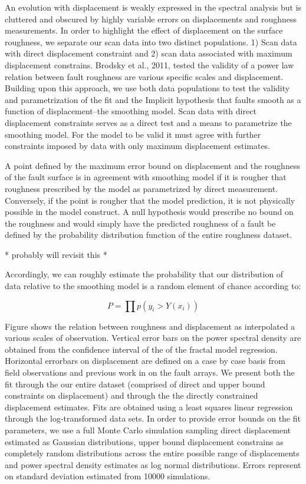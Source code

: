 \documentclass[12pt,a4paper]{article}
\begin{document}
An evolution with displacement is weakly expressed in the spectral analysis but is cluttered and obscured by highly variable errors on displacements and roughness measurements. In order to highlight the effect of displacement on the surface roughness, we separate our scan data into two distinct populations. 1) Scan data with direct displacement constraint and 2) scan data associated with maximum displacement constrains.  Brodsky et al., 2011, tested the validity of a power law relation between fault roughness are various specific scales and displacement. Building upon this approach, we use both data populations to test the validity and parametrization of the fit and the Implicit hypothesis that faults smooth as a function of displacement--the smoothing model. Scan data with direct displacement constraints serves as a direct test and a means to parametrize the smoothing model. For the model to be valid it must agree with further constraints imposed by data with only maximum displacement estimates.

A point defined by the maximum error bound on displacement and the roughness of the fault surface is in agreement with smoothing model if it is rougher that roughness prescribed by the model as parametrized by direct measurement. Conversely, if the point is rougher that the model prediction, it is not physically possible in the model construct. A null hypothesis would prescribe no bound on the roughness and would simply have the predicted roughness of a fault be defined by the probability distribution function of the entire roughness dataset.

* probably will revisit this *

Accordingly, we can roughly estimate the probability that our distribution of data relative to the smoothing model is a random element of chance according to:

\begin{equation}
 P = \prod p(y_i>Y(x_i))
\end{equation} 
 
 

Figure shows the relation between roughness and displacement as interpolated a various scales of observation. Vertical error bars on the power spectral density are obtained from the confidence interval of the of the fractal model regression. Horizontal errorbars on displacement are defined on a case by case basis from field observations and previous work in on the fault arrays. We present both the fit through the our entire dataset (comprised of direct and upper bound constraints on displacement) and through the the directly constrained displacement estimates. Fits are obtained using a least squares linear regression through the log-transformed data sets. In order to provide error bounds on the fit parameters, we use a full Monte Carlo simulation sampling direct displacement estimated as Gaussian distributions, upper bound displacement constrains as completely random distributions across the entire possible range of displacements and power spectral density estimates as log normal distributions. Errors represent on standard deviation estimated from 10000 simulations.
\end{document}
